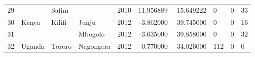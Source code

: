 \begin{tabular}{llllrrrlll}
29 &                    &           Safim &                           &  2010 &  11.956889 & -15.649222 &       0 &        0 &      33 \\
30 &              Kenya &          Kilifi &                     Junju &  2012 &  -3.862000 &  39.745000 &       0 &        0 &      16 \\
31 &                    &                 &                   Mbogolo &  2012 &  -3.635000 &  39.858000 &       0 &        0 &      32 \\
32 &             Uganda &          Tororo &                 Nagongera &  2012 &   0.770000 &  34.026000 &     112 &        0 &       0 \\
\bottomrule
\end{tabular}
